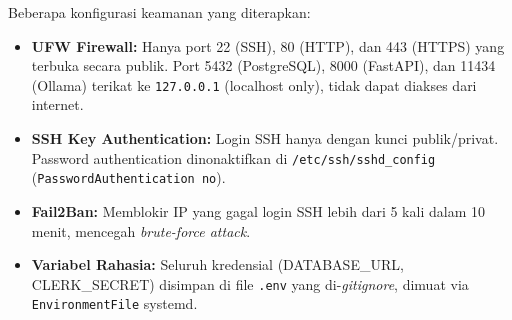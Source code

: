 Beberapa konfigurasi keamanan yang diterapkan:
\begin{itemize}[noitemsep]
  \item \textbf{UFW Firewall:} Hanya port 22 (SSH), 80 (HTTP), dan 443 (HTTPS)
    yang terbuka secara publik. Port 5432 (PostgreSQL), 8000 (FastAPI), dan
    11434 (Ollama) terikat ke \texttt{127.0.0.1} (localhost only), tidak dapat
    diakses dari internet.
  \item \textbf{SSH Key Authentication:} Login SSH hanya dengan kunci publik/privat.
    Password authentication dinonaktifkan di \texttt{/etc/ssh/sshd\_config}
    (\texttt{PasswordAuthentication no}).
  \item \textbf{Fail2Ban:} Memblokir IP yang gagal login SSH lebih dari 5 kali
    dalam 10 menit, mencegah \textit{brute-force attack}.
  \item \textbf{Variabel Rahasia:} Seluruh kredensial (DATABASE\_URL, CLERK\_SECRET)
    disimpan di file \texttt{.env} yang di-\textit{gitignore}, dimuat via
    \texttt{EnvironmentFile} systemd.
\end{itemize}
